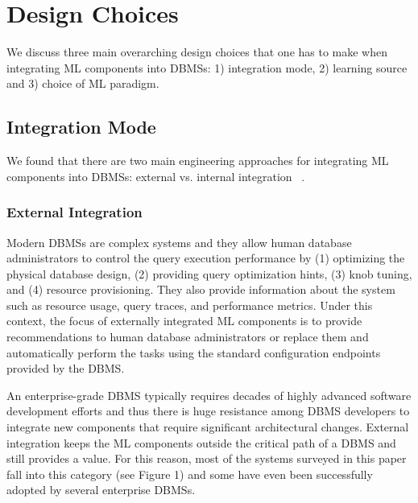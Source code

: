 \section{Design Choices}

We discuss three main overarching design choices that one has to make when integrating ML components into DBMSs: 1) integration mode, 2)  learning source and 3) choice of ML paradigm.


\subsection{Integration Mode}
We found that there are two main engineering approaches for integrating ML components into DBMSs: external vs. internal integration ~\cite{pavlo2019external}.

\subsubsection{External Integration} Modern DBMSs are complex systems and they allow human database administrators to control the query execution performance by (1) optimizing the physical database design, (2) providing query optimization hints, (3) knob tuning, and (4) resource provisioning.
They also provide information about the system such as resource usage, query traces, and performance metrics.
Under this context, the focus of externally integrated ML components is to provide recommendations to human database administrators or replace them and automatically perform the tasks using the standard configuration endpoints provided by the DBMS.

An enterprise-grade DBMS typically requires decades of highly advanced software development efforts and thus there is huge resistance among DBMS developers to integrate new components that require significant architectural changes.
External integration keeps the ML components outside the critical path of a DBMS and still provides a value.
For this reason, most of the systems surveyed in this paper fall into this category (see Figure 1) and some have even been successfully adopted by several enterprise DBMSs.

